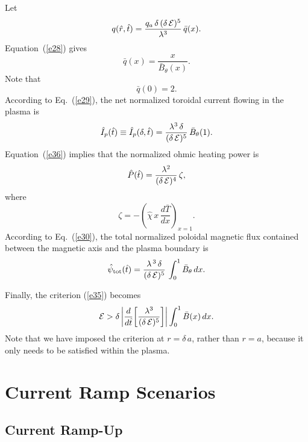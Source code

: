 \documentclass{iopjournal}
\begin{document}
Let
\begin{equation}\label{e54c}
q(\hat{r},\hat{t}) =\frac{q_a\,\delta\,(\delta\,{\cal E})^5}{\lambda^3}\,\bar{q}(x).
\end{equation}
Equation~(\ref{e28}) gives
\begin{equation}\label{e55c}
\bar{q}(x) = \frac{x}{\bar{B}_\theta(x)}.
\end{equation}
Note that
\begin{equation}\label{e56c}
\bar{q}(0)= 2.
\end{equation}
According to Eq.~(\ref{e29}), the net normalized toroidal current flowing in the plasma is
\begin{equation}\label{e57c}
\hat{I}_p(\hat{t}) \equiv \hat{I}_p(\delta,\hat{t})= \frac{\lambda^3\,\delta}{(\delta\,{\cal E})^5}\,\bar{B}_\theta(1).
\end{equation}
Equation~(\ref{e36}) implies that the normalized ohmic heating power is
\begin{equation}\label{e58c}
\hat{P}(\hat{t})= \frac{\lambda^2}{(\delta\,{\cal E})^4}\,\zeta,
\end{equation}
where
\begin{equation}
\zeta = - \left(\hat{\chi}\,x\,\frac{d\bar{T}}{dx}\right)_{x=1}.
\end{equation}
According to Eq.~(\ref{e30}), the total normalized poloidal magnetic flux contained between the magnetic axis and the plasma
boundary is
\begin{equation}\label{e60c}
\hat{\psi}_{\rm tot}(\hat{t}) = \frac{\lambda^{\,3}\,\delta}{(\delta\,{\cal E})^5}\,\int_0^1\bar{B}_\theta\,dx.
\end{equation}

Finally, the criterion (\ref{e35}) becomes 
\begin{equation}\label{e55}
{\cal E}> \delta\left|\frac{d}{d\hat{t}}\!\left[\frac{\lambda^3}{(\delta\,{\cal E})^5}\right]\right|\int_0^1\bar{B}(x)\,dx.
\end{equation}
Note that we have imposed the criterion at $r=\delta\,a$, rather than $r=a$, because it only needs to be satisfied
within the plasma. 

\section{Current Ramp Scenarios}
\subsection{Current Ramp-Up}
\end{document}
